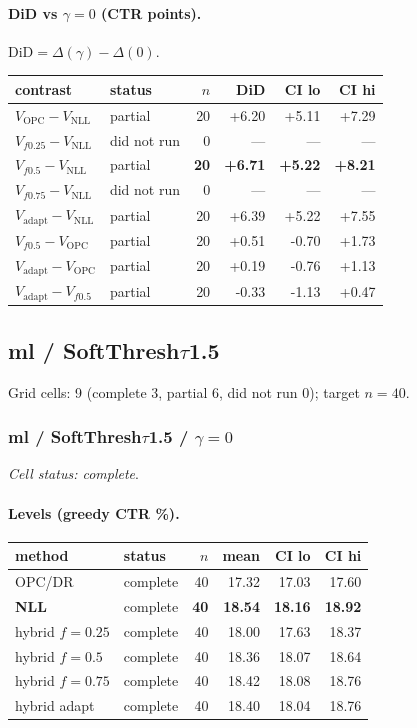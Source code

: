 \documentclass[10pt,a4paper]{article}
\begin{document}
\paragraph{DiD vs $\gamma=0$ (CTR points).} $\mathrm{DiD}=\Delta(\gamma)-\Delta(0)$.
{\centering\small\begin{tabular}{llrrrr}
\toprule contrast & status & $n$ & DiD & CI lo & CI hi \\
\midrule
$V_{\mathrm{OPC}}-V_{\mathrm{NLL}}$ & partial & 20 & +6.20 & +5.11 & +7.29 \\
$V_{f0.25}-V_{\mathrm{NLL}}$ & did not run & 0 & --- & --- & --- \\
\textbf{$V_{f0.5}-V_{\mathrm{NLL}}$} & partial & \textbf{20} & \textbf{+6.71} & \textbf{+5.22} & \textbf{+8.21} \\
$V_{f0.75}-V_{\mathrm{NLL}}$ & did not run & 0 & --- & --- & --- \\
$V_{\mathrm{adapt}}-V_{\mathrm{NLL}}$ & partial & 20 & +6.39 & +5.22 & +7.55 \\
$V_{f0.5}-V_{\mathrm{OPC}}$ & partial & 20 & +0.51 & -0.70 & +1.73 \\
$V_{\mathrm{adapt}}-V_{\mathrm{OPC}}$ & partial & 20 & +0.19 & -0.76 & +1.13 \\
$V_{\mathrm{adapt}}-V_{f0.5}$ & partial & 20 & -0.33 & -1.13 & +0.47 \\
\bottomrule\end{tabular}\par}
\bigskip
\newpage
\subsection{ml / SoftThresh$\tau$1.5}
Grid cells: 9 (complete 3, partial 6, did not run 0); target $n=40$.
\subsubsection{ml / SoftThresh$\tau$1.5 / $\gamma=0$}
\emph{Cell status: complete}.
\paragraph{Levels (greedy CTR \%).}
{\centering\small\begin{tabular}{llrrrr}
\toprule method & status & $n$ & mean & CI lo & CI hi \\
\midrule
OPC/DR & complete & 40 & 17.32 & 17.03 & 17.60 \\
\textbf{NLL} & complete & \textbf{40} & \textbf{18.54} & \textbf{18.16} & \textbf{18.92} \\
hybrid $f{=}0.25$ & complete & 40 & 18.00 & 17.63 & 18.37 \\
hybrid $f{=}0.5$ & complete & 40 & 18.36 & 18.07 & 18.64 \\
hybrid $f{=}0.75$ & complete & 40 & 18.42 & 18.08 & 18.76 \\
hybrid adapt & complete & 40 & 18.40 & 18.04 & 18.76 \\
\bottomrule\end{tabular}\par}
\end{document}
